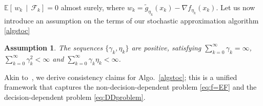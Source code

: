 \documentclass[11pt,reqno]{amsart}
\newcommand{\1}{{\bf 1}}
\newcommand{\2}{{\bf 2}}
\newcommand{\us}[1]{\textcolor{red}{#1}}
\newcommand{\bxi}{\boldsymbol{\xi}}
\numberwithin{equation}{section}
\newtheorem{assumption}{Assumption}[section]
\theoremstyle{remark}
\begin{document}
{			$\mathbb{E}[ \, w_k \, \mid \, \mathcal{F}_k] = 0$ almost surely, where $w_k = \tilde{g}_{\eta_k}(x_k) - \nabla f_{\eta_k}(x_k)$. 
			Let us now introduce an assumption on the terms of our stochastic approximation algorithm \eqref{algstoc}
			
			\begin{assumption} \label{asm:covstoc4}
				The sequences $\{\gamma_{k},\eta_k\}$ are positive, satisfying \( \sum_{k=0}^{\infty} \gamma_{k}=\infty \), \( \sum_{k=0}^{\infty} \gamma_{k}^{2}<\infty \) and $ \sum_{k=0}^{\infty} \gamma_k\eta_k < \infty $.
		\end{assumption}
		\medskip
		Akin to~\cite{Farzad1}, we derive consistency claims for Algo.~\eqref{algstoc}; this is a unified framework that captures the non-decision-dependent problem \eqref{eq:f=EF} and the decision-dependent problem \eqref{eq:DDproblem}. %
		
		\medskip
		
}
\end{document}
